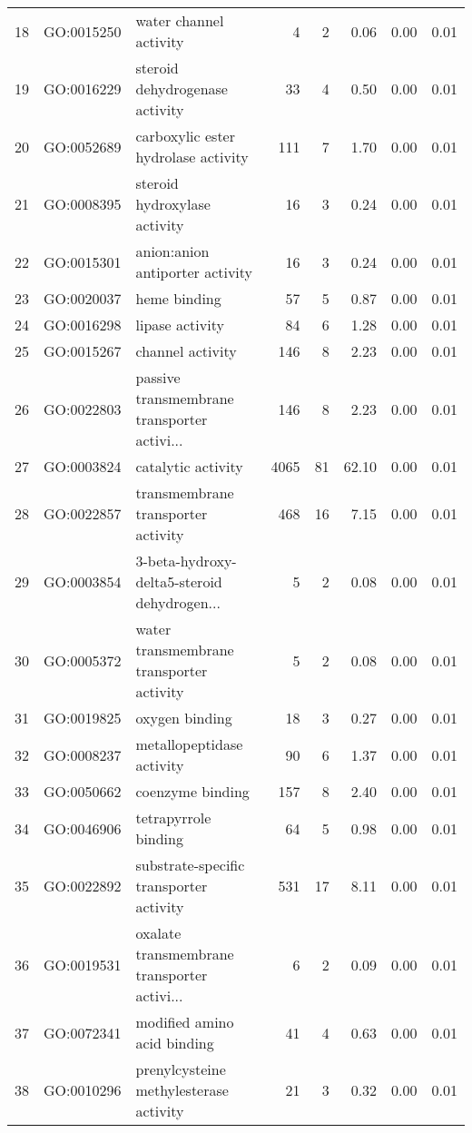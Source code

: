 \begin{table}[ht]
\begin{tabular}{rllrrrrr}
  18 & GO:0015250 & water channel activity &   4 &   2 & 0.06 & 0.00 & 0.01 \\ 
  19 & GO:0016229 & steroid dehydrogenase activity &  33 &   4 & 0.50 & 0.00 & 0.01 \\ 
  20 & GO:0052689 & carboxylic ester hydrolase activity & 111 &   7 & 1.70 & 0.00 & 0.01 \\ 
  21 & GO:0008395 & steroid hydroxylase activity &  16 &   3 & 0.24 & 0.00 & 0.01 \\ 
  22 & GO:0015301 & anion:anion antiporter activity &  16 &   3 & 0.24 & 0.00 & 0.01 \\ 
  23 & GO:0020037 & heme binding &  57 &   5 & 0.87 & 0.00 & 0.01 \\ 
  24 & GO:0016298 & lipase activity &  84 &   6 & 1.28 & 0.00 & 0.01 \\ 
  25 & GO:0015267 & channel activity & 146 &   8 & 2.23 & 0.00 & 0.01 \\ 
  26 & GO:0022803 & passive transmembrane transporter activi... & 146 &   8 & 2.23 & 0.00 & 0.01 \\ 
  27 & GO:0003824 & catalytic activity & 4065 &  81 & 62.10 & 0.00 & 0.01 \\ 
  28 & GO:0022857 & transmembrane transporter activity & 468 &  16 & 7.15 & 0.00 & 0.01 \\ 
  29 & GO:0003854 & 3-beta-hydroxy-delta5-steroid dehydrogen... &   5 &   2 & 0.08 & 0.00 & 0.01 \\ 
  30 & GO:0005372 & water transmembrane transporter activity &   5 &   2 & 0.08 & 0.00 & 0.01 \\ 
  31 & GO:0019825 & oxygen binding &  18 &   3 & 0.27 & 0.00 & 0.01 \\ 
  32 & GO:0008237 & metallopeptidase activity &  90 &   6 & 1.37 & 0.00 & 0.01 \\ 
  33 & GO:0050662 & coenzyme binding & 157 &   8 & 2.40 & 0.00 & 0.01 \\ 
  34 & GO:0046906 & tetrapyrrole binding &  64 &   5 & 0.98 & 0.00 & 0.01 \\ 
  35 & GO:0022892 & substrate-specific transporter activity & 531 &  17 & 8.11 & 0.00 & 0.01 \\ 
  36 & GO:0019531 & oxalate transmembrane transporter activi... &   6 &   2 & 0.09 & 0.00 & 0.01 \\ 
  37 & GO:0072341 & modified amino acid binding &  41 &   4 & 0.63 & 0.00 & 0.01 \\ 
  38 & GO:0010296 & prenylcysteine methylesterase activity &  21 &   3 & 0.32 & 0.00 & 0.01 \\ 

\end{tabular}
\end{table}
